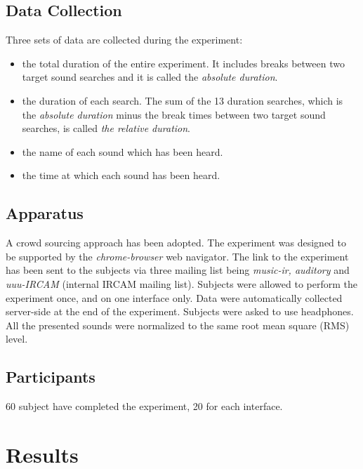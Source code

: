 \documentclass{aes2e}
\begin{document}
\subsection{Data Collection}
Three sets of data are collected during the experiment:
\begin{itemize}
\item the total duration of the entire experiment. It includes breaks between two target sound searches and it is called the \textit{absolute duration}.
\item the duration of each search. The sum of the 13 duration searches, which is the \textit{absolute duration} minus the break times between two target sound searches, is called \textit{the relative duration}.
\item the name of each sound which has been heard.
\item the time at which each sound has been heard.  
\end{itemize}



\subsection{Apparatus}
A crowd sourcing approach has been adopted. The experiment was designed to be supported by the  \textit{chrome-browser} web navigator. The link to the experiment has been sent to the subjects via three  mailing list being \textit{music-ir, auditory} and \textit{uuu-IRCAM} (internal IRCAM mailing list). Subjects were allowed to perform the experiment once, and on one interface only. Data were automatically collected server-side at the end of the experiment. Subjects were asked to use headphones. All the presented sounds were normalized to the same root mean square (RMS) level.
\subsection{Participants}
60 subject have completed the experiment, 20 for each interface.

\section{Results} \label{results}
\end{document}
